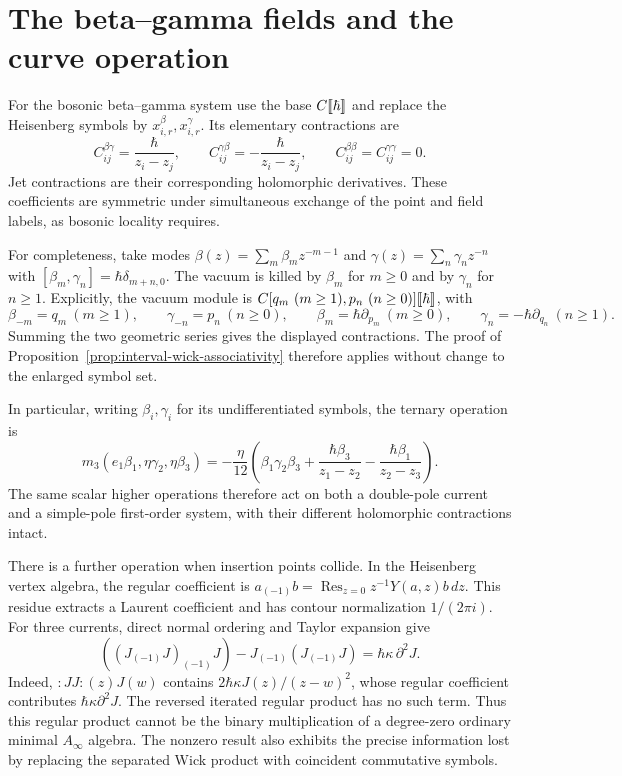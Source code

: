 \section{The beta--gamma fields and the curve operation}

For the bosonic beta--gamma system use the base $C\llbracket\hbar\rrbracket$
and replace the Heisenberg symbols by
$x_{i,r}^{\beta},x_{i,r}^{\gamma}$.  Its elementary contractions are
\[
 C_{ij}^{\beta\gamma}=\frac{\hbar}{z_i-z_j},\qquad
 C_{ij}^{\gamma\beta}=-\frac{\hbar}{z_i-z_j},\qquad
 C_{ij}^{\beta\beta}=C_{ij}^{\gamma\gamma}=0.
\]
Jet contractions are their corresponding holomorphic derivatives.
These coefficients are symmetric under simultaneous exchange of the
point and field labels, as bosonic locality requires.

For completeness, take modes
$\beta(z)=\sum_m\beta_mz^{-m-1}$ and
$\gamma(z)=\sum_n\gamma_nz^{-n}$ with
$[\beta_m,\gamma_n]=\hbar\delta_{m+n,0}$.
The vacuum is killed by $\beta_m$ for $m\ge0$ and by $\gamma_n$
for $n\ge1$.  Explicitly, the vacuum module is
$\C[q_m\ (m\ge1),p_n\ (n\ge0)]\llbracket\hbar\rrbracket$, with
\[
 \beta_{-m}=q_m\ (m\ge1),\qquad
 \gamma_{-n}=p_n\ (n\ge0),\qquad
 \beta_m=\hbar\partial_{p_m}\ (m\ge0),\qquad
 \gamma_n=-\hbar\partial_{q_n}\ (n\ge1).
\]
Summing the two geometric series gives the displayed contractions.
The proof of Proposition~\ref{prop:interval-wick-associativity}
therefore applies without change to the enlarged symbol set.

In particular, writing $\beta_i,\gamma_i$ for its undifferentiated
symbols, the ternary operation is
\[
 m_3(e_1\beta_1,\eta\gamma_2,\eta\beta_3)
 =-\frac{\eta}{12}\left(
 \beta_1\gamma_2\beta_3+
 \frac{\hbar\beta_3}{z_1-z_2}
 -\frac{\hbar\beta_1}{z_2-z_3}\right).
\]
The same scalar higher operations therefore act on both a double-pole
current and a simple-pole first-order system, with their different
holomorphic contractions intact.

There is a further operation when insertion points collide.  In the
Heisenberg vertex algebra, the regular coefficient is
$a_{(-1)}b=\operatorname{Res}_{z=0}z^{-1}Y(a,z)b\,dz$.
This residue extracts a Laurent coefficient and has contour
normalization $1/(2\pi i)$.  For three currents, direct normal ordering
and Taylor expansion give
\[
 ((J_{(-1)}J)_{(-1)}J)-J_{(-1)}(J_{(-1)}J)
 =\hbar\kappa\,\partial^2J.
\]
Indeed, $:JJ:(z)J(w)$ contains
$2\hbar\kappa J(z)/(z-w)^2$, whose regular coefficient contributes
$\hbar\kappa\partial^2J$.  The reversed iterated regular product
has no such term.  Thus this regular product cannot be the binary
multiplication of a degree-zero ordinary minimal $A_\infty$ algebra.
The nonzero result also exhibits the precise information lost by
replacing the separated Wick product with coincident commutative symbols.

